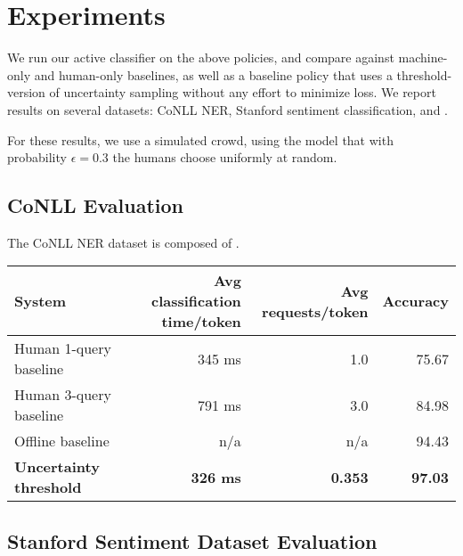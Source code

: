 \section{Experiments}
\label{sec:experiments}

We run our active classifier on the above policies, and compare against machine-only and human-only baselines, as well as a baseline policy that uses a threshold-version of uncertainty sampling without any effort to minimize loss.
 We report results on several datasets: CoNLL NER, Stanford sentiment classification, and .

For these results, we use a simulated crowd, using the model that with probability $\epsilon = 0.3$ the humans choose uniformly at random.

\subsection{CoNLL Evaluation}

The CoNLL NER dataset is composed of .\\

\begin{tabular}{ | l | r | r | r | }
    \hline
    System & Avg classification time/token & Avg requests/token & Accuracy \\ \hline
    Human 1-query baseline & 345 ms & 1.0 & 75.67 \\ \hline
    Human 3-query baseline & 791 ms & 3.0 & 84.98 \\ \hline
    Offline baseline & n/a & n/a & 94.43 \\ \hline
    \textbf{Uncertainty threshold} & \textbf{326 ms} & \textbf{0.353} & \textbf{97.03} \\
    \hline
\end{tabular}

\subsection{Stanford Sentiment Dataset Evaluation}



